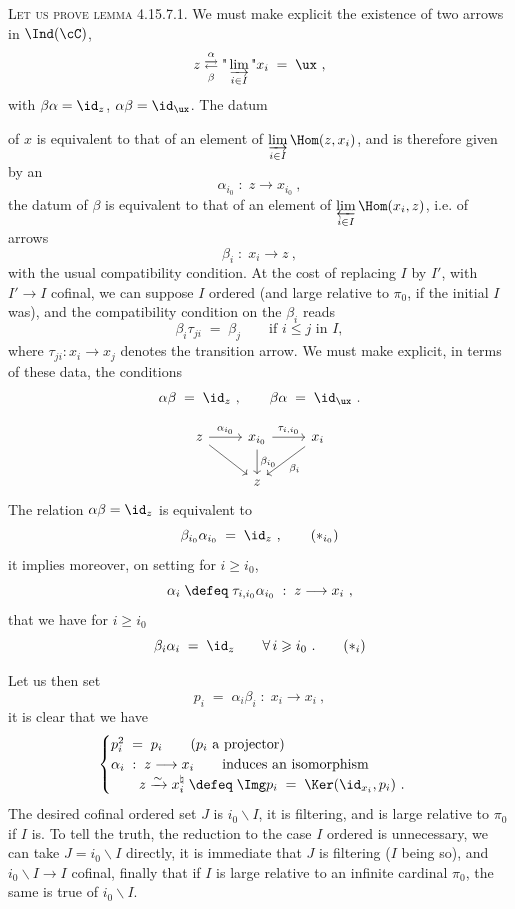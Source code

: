 \textsc{Let us prove lemma} 4.15.7.1. We must make explicit the existence of two arrows in $\Ind(\cC)$,
\[
z \underset{\beta}{\overset{\alpha}{\rightleftarrows}} \text{"}\varinjlim_{i\in I}\text{"} x_i \;=\; \ux\ ,
\]
with $\beta\alpha = \id_z$, $\alpha\beta = \id_{\ux}$. The datum

of $x$ is equivalent to that of an element of $\varinjlim\limits_{i\in I} \Hom(z,x_i)$, and is therefore given by an %
\[
\alpha_{i_0} \;:\; z \longrightarrow x_{i_0}\ ,
\]
the datum of $\beta$ is equivalent to that of an element of $\varprojlim\limits_{i\in I} \Hom(x_i,z)$, i.e. of arrows
\[
\beta_i \;:\; x_i \longrightarrow z\ ,
\]
with the usual compatibility condition. At the cost of replacing $I$ by $I'$, with $I' \longrightarrow I$ cofinal, we can suppose $I$ ordered (and large relative to $\pi_0$, if the initial $I$ was), and the compatibility condition on the $\beta_i$ reads
\[
\beta_i\tau_{ji} \;=\; \beta_j \qquad \text{if } i \leqslant j \text{ in } I,
\]
where $\tau_{ji} : x_i \longrightarrow x_j$ denotes the transition arrow. We must make explicit, in terms of these data, the conditions
\[
\alpha\beta \;=\; \id_z\ , \qquad \beta\alpha \;=\; \id_{\ux}\ .
\]

\[
\begin{tikzcd}
z \arrow[r, "\alpha_{i_0}"] \arrow[dr] & x_{i_0} \arrow[r, "\tau_{i,i_0}"] \arrow[d, "\beta_{i_0}"] & x_i \arrow[dl, "\beta_i"] \\
 & z &
\end{tikzcd}
\]
The relation $\alpha\beta = \id_z$ is equivalent to
\[
\beta_{i_0}\alpha_{i_0} \;=\; \id_z\ , \tag*{$(*_{i_0})$}
\]
it implies moreover, on setting for $i \geqslant i_0$,
\[
\alpha_i \;\defeq\; \tau_{i,i_0}\alpha_{i_0} \;:\; z \longrightarrow x_i\ ,
\]
that we have for $i \geqslant i_0$
\[
\beta_i\alpha_i \;=\; \id_z \qquad \forall\, i \geqslant i_0\ . \tag*{$(*_i)$}
\]

Let us then set
\[
p_i \;=\; \alpha_i\beta_i \;:\; x_i \longrightarrow x_i\ ,
\]
it is clear that we have
\[
\begin{cases}
p_i^2 \;=\; p_i \qquad \text{($p_i$ a projector)} \\
\alpha_i \;:\; z \longrightarrow x_i \qquad \text{induces an isomorphism} \\
\qquad z \xrightarrow{\sim} x_i^\natural \;\defeq\; \Img p_i \;=\; \Ker(\id_{x_i},p_i)\ .
\end{cases}
\]
The desired cofinal ordered set $J$ is $i_0\backslash I$, it is filtering, and is large relative to $\pi_0$ if $I$ is. To tell the truth, the reduction to the case $I$ ordered is unnecessary, we can take $J = i_0\backslash I$ directly, it is immediate that $J$ is filtering ($I$ being so), and $i_0\backslash I \longrightarrow I$ cofinal, finally that if $I$ is large relative to an infinite cardinal $\pi_0$, the same is true of $i_0\backslash I$.


